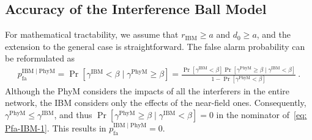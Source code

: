 \documentclass[12pt, draftclsnofoot, onecolumn]{IEEEtran}
\begin{document}
\subsection{Accuracy of the Interference Ball Model}\label{subsec: example-1-IBM}
For mathematical tractability, we assume that $r_{\mathrm{IBM}} \geq a$ and $d_0 \geq a$, and the extension to the general case is straightforward.
The false alarm probability can be reformulated as
\begin{align}\label{eq: Pfa-IBM-1}
p_{\mathrm{fa}}^{{\mathrm{IBM}} \mid {\mathrm{PhyM}}} = \Pr \left[\gamma^{\mathrm{IBM}} < \beta \mid \gamma^{\mathrm{PhyM}} \geq \beta \right]  = \frac{\Pr \left[\gamma^{\mathrm{IBM}} < \beta \right] \Pr \left[\gamma^{\mathrm{PhyM}} \geq \beta \mid \gamma^{\mathrm{IBM}} < \beta \right]}{1 - \Pr \left[\gamma^{\mathrm{PhyM}} < \beta \right]} \:.
\end{align}
Although the PhyM considers the impacts of all the interferers in the entire network, the IBM considers only the effects of the near-field ones. Consequently, $\gamma^{\mathrm{PhyM}} \leq \gamma^{\mathrm{IBM}}$, and thus $\Pr \left[\gamma^{\mathrm{PhyM}} \geq \beta \mid \gamma^{\mathrm{IBM}} < \beta \right] = 0$ in the nominator of~\eqref{eq: Pfa-IBM-1}. This results in ${p_{\mathrm{fa}}^{{\mathrm{IBM}} \mid {\mathrm{PhyM}}} = 0}$.
\end{document}
